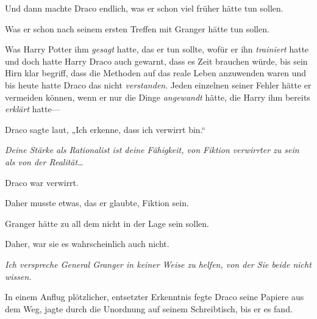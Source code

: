 Und dann machte Draco endlich, was er schon viel früher hätte tun sollen.

Was er schon nach seinem ersten Treffen mit Granger hätte tun sollen.

Was Harry Potter ihm \emph{gesagt} hatte, das er tun sollte, wofür er ihn \emph{trainiert} hatte und doch hatte Harry Draco auch gewarnt, dass es Zeit brauchen würde, bis sein Hirn klar begriff, dass die Methoden auf das reale Leben anzuwenden waren und bis heute hatte Draco das nicht \emph{verstanden}. Jeden einzelnen seiner Fehler hätte er vermeiden können, wenn er nur die Dinge \emph{angewandt} hätte, die Harry ihm bereits \emph{erklärt} hatte—

Draco sagte laut, „Ich erkenne, dass ich verwirrt bin.“

\emph{Deine Stärke als Rationalist ist deine Fähigkeit, von Fiktion verwirrter zu sein als von der Realität…}

Draco war verwirrt.

Daher musste etwas, das er glaubte, Fiktion sein.

Granger hätte zu all dem nicht in der Lage sein sollen.

Daher, war sie es wahrscheinlich auch nicht.

\emph{Ich verspreche General Granger in keiner Weise zu helfen, von der Sie beide nicht wissen.}

In einem Anflug plötzlicher, entsetzter Erkenntnis fegte Draco seine Papiere aus dem Weg, jagte durch die Unordnung auf seinem Schreibtisch, bis er es fand.

